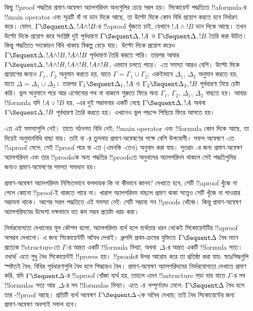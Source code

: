 \documentclass[../../../include/open-logic-section]{subfiles}
\begin{document}
কিছু !!{proof} পদ্ধতির
প্রমাণ-অন্বেষণ অ্যালগরিদম
অন্যগুলির চেয়ে সরল হয়।
সিকোয়েন্ট পদ্ধতিতে
!!a{formula}-র !!{main operator}
এবং সূত্রটি বাঁ না ডান দিকে
আছে, তা উল্টো দিকে কোন
বিধি প্রয়োগ করতে হবে
নির্ধারণ করে। যেমন,
$\Gamma \Sequent \Delta, !A \land !B$-র
!!a{proof} খুঁজতে চাই,
যেখানে $!A \land !B$
ডান দিকে আছে। তখন
\RightR{\land} উল্টো দিকে
প্রয়োগ করে সংশ্লিষ্ট দুই
পূর্বধারণা
$\Gamma \Sequent \Delta, !A$
ও $\Gamma \Sequent \Delta, !B$
তৈরি করা উচিত।
কিন্তু  পদ্ধতিতে
সংকোচন বিধি থাকায়
বিকল্প বেড়ে যায়।
উল্টো দিকে
\RightR{\Contraction}
প্রয়োগ করেও
$\Gamma \Sequent \Delta, !A \land
!B, !A \land !B$
পূর্বধারণা তৈরি করতে পারি।
তারপর আবার
$\Gamma \Sequent
\Delta, !A \land !B, !A \land !B, !A \land !B$,
এভাবে চলতে পারে।
-তে সমস্যা আরও বেশি।
\RightR{\land} উল্টো দিকে
প্রয়োগের জন্যও
$\Gamma_1$, $\Gamma_2$
অনুমান করতে হয়,
যাতে $\Gamma
= \Gamma_1 \cup \Gamma_2$;
একইভাবে $\Delta_1$, $\Delta_2$
অনুমান করতে হয়, যাতে
$\Delta
= \Delta_1 \cup \Delta_2$।
তারপর
$\Gamma_1 \Sequent \Delta_1, !A$
ও $\Gamma_2 \Sequent \Delta_2, !B$
পূর্বধারণা নিয়ে চেষ্টা করি।
ভুল অনুমানে পরে আর
এগোনোর পথ না থাকলে
শুরুতে ফিরে অন্য
$\Gamma_1$, $\Gamma_2$,
$\Delta_1$, $\Delta_2$
বাছতে হয়। আবার
!!{formula} যদি
$!A \lor !B$ হয়,
\RightR{\lor}-এর দুই
সম্ভাবনার একটি বেছে
$\Gamma \Sequent \Delta,
!A$ অথবা
$\Gamma \Sequent \Delta, !B$
পূর্বধারণা তৈরি করতে হয়।
এখানেও ভুল পছন্দে
পিছিয়ে ফিরে আসতে হয়।

-তে এই সমস্যাগুলি
নেই। তাতে গঠনগত বিধি
নেই; !!{main operator}
এবং !!{formula} কোন
দিকে আছে, তা দিয়েই
অনুমানবিধি বাছা যায়।
তাই  বা
-র তুলনায়
 প্রমাণ-অন্বেষণের
পক্ষে বেশি উপযোগী।
সফল অন্বেষণে -তে
!!a{proof} মেলে; সেই
!!{proof} পরে 
বা -তে
(এমনকি -তেও)
অনুবাদ করা যায়।
সুতরাং -র জন্য
প্রমাণ-অন্বেষণ অ্যালগরিদম
এবং তার !!{proof}sকে
অন্য পদ্ধতির !!{proof}sতে
অনুবাদের অ্যালগরিদম থাকলে
সেই পদ্ধতিগুলির জন্যও
প্রমাণ-অন্বেষণের সমস্যা
সমাধান হয়।

প্রমাণ-অন্বেষণ অ্যালগরিদম
নিশ্চিতভাবে ফলদায়ক কি না
কীভাবে জানব? দেখাতে হবে,
সেটি !!a{proof}
খুঁজে না পেলে কোনো
!!{proof}-ই থাকতে পারে না।
খারাপ অ্যালগরিদম বাছলে
প্রমাণ থাকা সত্ত্বেও
সেটি খুঁজে না পাওয়ার
সম্ভাবনা থাকে।
আগের সরল পদ্ধতিতে
এই সমস্যা নেই:
সেটি সম্ভাব্য সব
!!{proof}s খোঁজে।
কিন্তু প্রমাণ-অন্বেষণ
অ্যালগরিদমের উদ্দেশ্য
দক্ষভাবে যত কম সম্ভব
প্রচেষ্টা খরচ করা।

নির্ভরযোগ্যতা দেখানোর
মূল কৌশল হলো,
অ্যালগরিদম ব্যর্থ হলে
ব্যর্থতার ধরন থেকেই
সিকোয়েন্টটির
!!a{proof} অসম্ভব
দেখানো। এ জন্য
সিকোয়েন্টটি অবৈধ
দেখাই। ধ্রুপদি প্রথম-ক্রমের
যুক্তিতে
$\Gamma \Sequent \Delta$
বৈধ মানে প্রত্যেক
!!{structure}-তে
$\Gamma$-র অন্তত একটি
!!{formula} মিথ্যা,
অথবা~$\Delta$-র অন্তত
একটি !!{formula} সত্য।
 \emph{যথার্থ}:
এতে শুধু বৈধ
সিকোয়েন্টই !!{prove}s হয়।
!!{proof}sর উপর
আরোহ করে তা প্রতিষ্ঠা করা যায়:
স্বতঃসিদ্ধগুলি স্পষ্টতই বৈধ;
বিধির পূর্বধারণাগুলি
বৈধ হলে সিদ্ধান্তও বৈধ।
প্রমাণ-অন্বেষণ অ্যালগরিদমের
নির্ভরযোগ্যতা দেখাতে
প্রমাণ করি, যদি
$\Gamma \Sequent \Delta$-র
!!a{proof} খোঁজা
ব্যর্থ হয়, তাহলে
এমন !!a{structure}
গড়া যায় যাতে
$\Gamma$-র সব
!!{formula}s সত্য
আর~$\Delta$-র সব
!!{formula}s মিথ্যা।
এতে -র
\emph{সম্পূর্ণতা}ও মেলে:
$\Gamma \Sequent \Delta$
বৈধ হলে তার
-!!{proof} আছে।
প্রতিটি ব্যর্থ অন্বেষণ
$\Gamma \Sequent \Delta$-কে
অবৈধ দেখায়; তাই
বৈধ সিকোয়েন্টের জন্য
প্রমাণ-অন্বেষণ অবশ্যই
সফল হবে।
\end{document}

